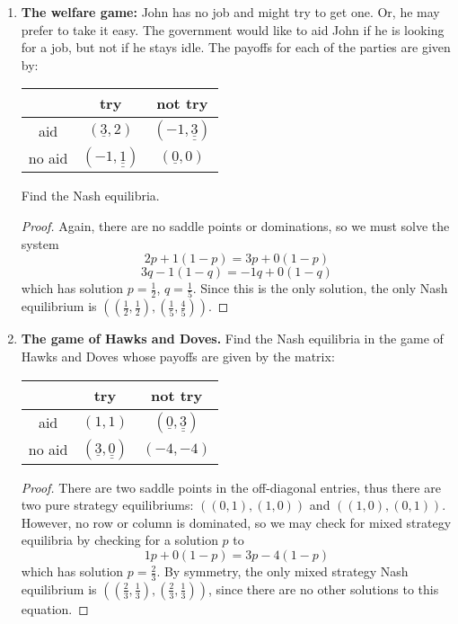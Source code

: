\documentclass[10pt]{article}
\begin{document}
\begin{enumerate}
\item \textbf{The welfare game:} John has no job and might try to get one. Or, he may prefer to take it easy. The government would like to aid John if he is looking for a job, but not if he stays idle. The payoffs for each of the parties are given by:
\\
\begin{center}
\begin{tabular}{|c|c|c|}
\hline 
 & try & not try \\ 
\hline 
aid & $(\underline{3},2)$ & $(-1,\underline{\underline{3}})$ \\ 
\hline 
no aid & $(-1,\underline{\underline{1}})$ & $(\underline{0},0)$ \\ 
\hline
\end{tabular}
\end{center}
\noindent Find the Nash equilibria.

\begin{proof}
Again, there are no saddle points or dominations, so we must solve the system
$$
2p + 1(1-p) = 3p + 0(1-p)
$$
$$
3q - 1(1-q) = -1q + 0(1-q)
$$
which has solution $p = \frac{1}{2}$, $q = \frac15$.  Since this is the only solution, the only Nash equilibrium is $((\frac12, \frac12),(\frac15, \frac45))$.
\end{proof}


\item \textbf{The game of Hawks and Doves.} Find the Nash equilibria in the game of Hawks and Doves whose payoffs are given by the matrix:
\\
\begin{center}
\begin{tabular}{|c|c|c|}
\hline 
 & try & not try \\ 
\hline 
aid & $(1,1)$ & $(\underline{0},\underline{\underline{3}})$ \\ 
\hline 
no aid & $(\underline{3},\underline{\underline{0}})$ & $(-4,-4)$ \\ 
\hline
\end{tabular}
\end{center}
\begin{proof}
There are two saddle points in the off-diagonal entries, thus there are two pure strategy equilibriums: $((0,1),(1,0))$ and $((1,0),(0,1))$.  However, no row or column is dominated, so we may check for mixed strategy equilibria by checking for a solution $p$ to
$$
1p + 0(1-p) = 3p - 4(1-p)
$$
which has solution $p = \frac23$.  By symmetry, the only mixed strategy Nash equilibrium is $((\frac23, \frac13),(\frac23, \frac13))$, since there are no other solutions to this equation.
\end{proof}
\end{enumerate}
\end{document}
